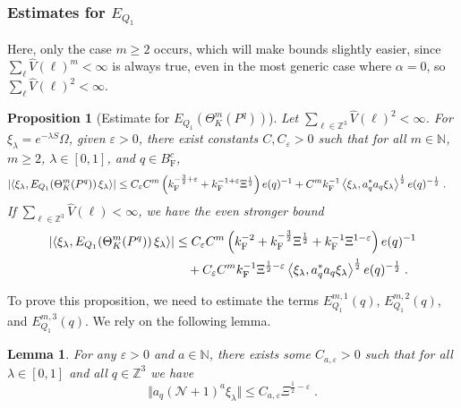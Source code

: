 \documentclass[12pt,a4paper]{article}
\numberwithin{equation}{section}
\newcommand{\cN}{\mathcal{N}}
\newcommand{\NNN}{\mathbb{N}}
\newcommand{\1}{\mathbb{I}}
\newcommand{\F}{\mathrm{F}}
\newcommand{\Zstar}{\mathbb{Z}^3} %
\newcommand{\N}{\mathbb{N}}
\newcommand{\Z}{\mathbb{Z}}
\newcommand{\half}{\frac{1}{2}}
\newcommand{\eva}[1]{\left\langle #1 \right\rangle}
\theoremstyle{plain}
\newtheorem{lemma}[theorem]{Lemma}
\newtheorem{proposition}[theorem]{Proposition}
\theoremstyle{definition}
\theoremstyle{remark}
\theoremstyle{plain}
\theoremstyle{definition}
\theoremstyle{remark}
\begin{document}
\subsubsection{Estimates for $E_{Q_1}$}

Here, only the case $ m \ge 2 $ occurs, which will make bounds slightly easier, since $ \sum_\ell \hat{V}(\ell)^m < \infty $ is always true, even in the most generic case where $ \alpha = 0 $, so $ \sum_\ell \hat{V}(\ell)^2 < \infty $.

\begin{proposition}[Estimate for $E_{Q_1}(\Theta^m_{K}(P^q))$]\label{prop:finEQ1est}
Let $ \sum_{\ell \in \Zstar} \hat{V}(\ell)^2 < \infty $. For $\xi_\lambda = e^{-\lambda S} \Omega$, given $ \varepsilon > 0 $, there exist constants $ C, C_\varepsilon > 0 $ such that for all $ m \in \NNN $, $ m \ge 2 $, $ \lambda \in [0,1] $, and $ q \in B_{\F}^c $,
\begin{align} \label{eq:finalEQ1est_Coulomb}
	\abs{\eva{\xi_\lambda, E_{Q_1}\!\left(\Theta^m_K(P^q)\right) \xi_\lambda}}
	&\leq C_\varepsilon C^m \left( k_{\F}^{-\frac 32 + \varepsilon}
		+ k_{\F}^{-1 + \varepsilon} \Xi^\half \right)
		e(q)^{-1}
		+ C^m k_{\F}^{-1} \eva{\xi_\lambda, a_q^* a_q \xi_\lambda}^{\half} e(q)^{-\half} \;.
\end{align}
If $ \sum_{\ell \in \Zstar} \hat{V}(\ell) < \infty $, we have the even stronger bound
\begin{align} \label{eq:finalEQ1est}
	\abs{\eva{\xi_\lambda, E_{Q_1}\!\left(\Theta^m_K(P^q)\right) \xi_\lambda}}
	&\leq C_\varepsilon C^m \left(
		k_{\F}^{-2}
		+ k_{\F}^{-\frac{3}{2}} \Xi^\half
		+ k_{\F}^{-1}\Xi^{1-\varepsilon} \right) e(q)^{-1} \nonumber\\
	&\quad + C_\varepsilon C^m k_{\F}^{-1} \Xi^{\half - \varepsilon} \eva{\xi_\lambda, a_q^* a_q \xi_\lambda}^{\half} e(q)^{-\half} \;.
\end{align}
\end{proposition}

To prove this proposition, we need to estimate the terms $ E^{m,1}_{Q_1}(q) $, $ E^{m,2}_{Q_1}(q) $, and $ E^{m,3}_{Q_1}(q) $. We rely on the following lemma.

\begin{lemma} \label{lem:Xi_halfminusepsilon}
For any $ \varepsilon > 0 $ and $ a \in \N $, there exists some $ C_{a,\varepsilon} > 0 $ such that for all $ \lambda \in [0,1] $ and all $ q \in \Z^3 $ we have
\begin{equation} \label{eq:Xi_halfminusepsilon}
	\Vert a_q (\cN + 1)^a \xi_\lambda \Vert
	\le C_{a,\varepsilon} \Xi^{\half-\varepsilon} \;.
\end{equation}
\end{lemma}
\end{document}
